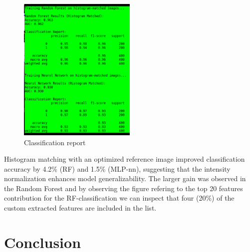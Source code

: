 \documentclass[11pt,a4paper]{article}
\begin{document}
		\begin{figure}[H]
			\centering
			\includegraphics[width=0.5\textwidth]{images/report_hm.png}
			\caption{Classification report}
			\label{fig1:}
		\end{figure}		

Histogram matching with an optimized reference image improved 
classification accuracy by 4.2\% (RF) and 1.5\% (MLP-nn), 
suggesting that the intensity normalization enhances model generalizability. 
The larger gain was observed in the Random Forest and by observing the figure refering to the
top 20 features contribution for the RF-classification we can inspect that four (20\%) of the 
custom extracted features are included in the list.

\section{Conclusion}





 
\end{document}
